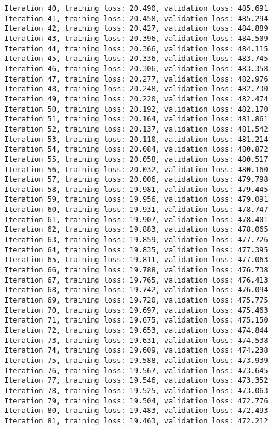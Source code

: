 \documentclass[11pt]{article}
\begin{document}
\begin{Verbatim}[commandchars=\\\{\}]
Iteration 40, training loss: 20.490, validation loss: 485.691
Iteration 41, training loss: 20.458, validation loss: 485.294
Iteration 42, training loss: 20.427, validation loss: 484.889
Iteration 43, training loss: 20.396, validation loss: 484.509
Iteration 44, training loss: 20.366, validation loss: 484.115
Iteration 45, training loss: 20.336, validation loss: 483.745
Iteration 46, training loss: 20.306, validation loss: 483.358
Iteration 47, training loss: 20.277, validation loss: 482.976
Iteration 48, training loss: 20.248, validation loss: 482.730
Iteration 49, training loss: 20.220, validation loss: 482.474
Iteration 50, training loss: 20.192, validation loss: 482.170
Iteration 51, training loss: 20.164, validation loss: 481.861
Iteration 52, training loss: 20.137, validation loss: 481.542
Iteration 53, training loss: 20.110, validation loss: 481.214
Iteration 54, training loss: 20.084, validation loss: 480.872
Iteration 55, training loss: 20.058, validation loss: 480.517
Iteration 56, training loss: 20.032, validation loss: 480.160
Iteration 57, training loss: 20.006, validation loss: 479.798
Iteration 58, training loss: 19.981, validation loss: 479.445
Iteration 59, training loss: 19.956, validation loss: 479.091
Iteration 60, training loss: 19.931, validation loss: 478.747
Iteration 61, training loss: 19.907, validation loss: 478.401
Iteration 62, training loss: 19.883, validation loss: 478.065
Iteration 63, training loss: 19.859, validation loss: 477.726
Iteration 64, training loss: 19.835, validation loss: 477.395
Iteration 65, training loss: 19.811, validation loss: 477.063
Iteration 66, training loss: 19.788, validation loss: 476.738
Iteration 67, training loss: 19.765, validation loss: 476.413
Iteration 68, training loss: 19.742, validation loss: 476.094
Iteration 69, training loss: 19.720, validation loss: 475.775
Iteration 70, training loss: 19.697, validation loss: 475.463
Iteration 71, training loss: 19.675, validation loss: 475.150
Iteration 72, training loss: 19.653, validation loss: 474.844
Iteration 73, training loss: 19.631, validation loss: 474.538
Iteration 74, training loss: 19.609, validation loss: 474.238
Iteration 75, training loss: 19.588, validation loss: 473.939
Iteration 76, training loss: 19.567, validation loss: 473.645
Iteration 77, training loss: 19.546, validation loss: 473.352
Iteration 78, training loss: 19.525, validation loss: 473.063
Iteration 79, training loss: 19.504, validation loss: 472.776
Iteration 80, training loss: 19.483, validation loss: 472.493
Iteration 81, training loss: 19.463, validation loss: 472.212

\end{Verbatim}
\end{document}
